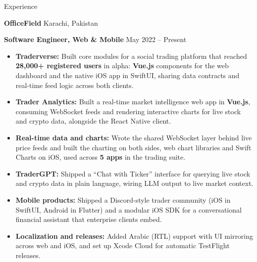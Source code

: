 \documentclass{resume}
\begin{document}
\begin{rSection}{Experience}

\textbf{OfficeField} \hfill Karachi, Pakistan

\textbf{Software Engineer, Web \& Mobile} \hfill May 2022 -- Present
\begin{itemize}
\itemsep 1pt {}
\item \textbf{Traderverse:} Built core modules for a social trading platform that reached \textbf{28,000+ registered users} in alpha: \textbf{Vue.js} components for the web dashboard and the native iOS app in SwiftUI, sharing data contracts and real-time feed logic across both clients.
\item \textbf{Trader Analytics:} Built a real-time market intelligence web app in \textbf{Vue.js}, consuming WebSocket feeds and rendering interactive charts for live stock and crypto data, alongside the React Native client.
\item \textbf{Real-time data and charts:} Wrote the shared WebSocket layer behind live price feeds and built the charting on both sides, web chart libraries and Swift Charts on iOS, used across \textbf{5 apps} in the trading suite.
\item \textbf{TraderGPT:} Shipped a ``Chat with Ticker'' interface for querying live stock and crypto data in plain language, wiring LLM output to live market context.
\item \textbf{Mobile products:} Shipped a Discord-style trader community (iOS in SwiftUI, Android in Flutter) and a modular iOS SDK for a conversational financial assistant that enterprise clients embed.
\item \textbf{Localization and releases:} Added Arabic (RTL) support with UI mirroring across web and iOS, and set up Xcode Cloud for automatic TestFlight releases.
\end{itemize}

\end{rSection}
\end{document}
